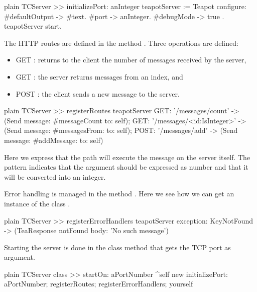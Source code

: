 \documentclass[10pt,twoside,english]{_support/latex/sbabook/sbabook}
\begin{document}
\begin{displaycode}{plain}
TCServer >> initializePort: anInteger
	teapotServer := Teapot configure: { 
		#defaultOutput -> #text.
		#port -> anInteger.
		#debugMode -> true
	}.
	teapotServer start.
\end{displaycode}

The HTTP routes are defined in the method . Three operations are defined: 

\begin{itemize}
\item GET : returns to the client the number of messages received by the server, 
\item GET : the server returns messages from an index, and
\item POST : the client sends a new message to the server.
\end{itemize}

\begin{displaycode}{plain}
TCServer >> registerRoutes
	teapotServer
		GET: '/messages/count' -> (Send message: #messageCount to: self);
		GET: '/messages/<id:IsInteger>' -> (Send message: #messagesFrom: to: self);
		POST: '/messages/add' -> (Send message: #addMessage: to: self)
\end{displaycode}

Here we express that the path  will execute the message  on the server itself.
The pattern  indicates that the argument should be expressed as number and that it will be converted
into an integer. 

Error handling is managed in the method . Here we see how we can get an instance of the class .

\begin{displaycode}{plain}
TCServer >> registerErrorHandlers
	teapotServer
		exception: KeyNotFound -> (TeaResponse notFound body: 'No such message')
\end{displaycode}

Starting the server is done in the class method  that gets the TCP port as argument. 

\begin{displaycode}{plain}
TCServer class >> startOn: aPortNumber
	^self new
		initializePort: aPortNumber;
		registerRoutes;
		registerErrorHandlers;
		yourself
\end{displaycode}
\end{document}
